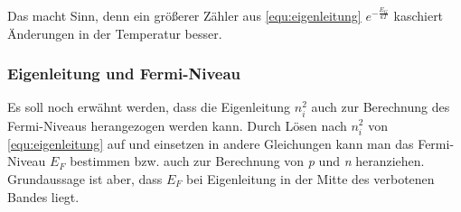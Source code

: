     Das macht Sinn, denn ein größerer Zähler aus \autoref{equ:eigenleitung} $e^{-\frac{E_G}{kT}}$ kaschiert Änderungen in der Temperatur besser.
    
    \subsubsection{Eigenleitung und Fermi-Niveau}
    Es soll noch erwähnt werden, dass die Eigenleitung $n_i^2$ auch zur Berechnung des Fermi-Niveaus herangezogen werden kann.
    Durch Lösen nach $n_i^2$ von \autoref{equ:eigenleitung} auf und einsetzen in andere Gleichungen kann man das Fermi-Niveau $E_F$ bestimmen bzw. auch zur Berechnung von \textit{p} und \textit{n} heranziehen. 
    Grundaussage ist aber, dass $E_F$ bei Eigenleitung in der Mitte des verbotenen Bandes liegt.
    